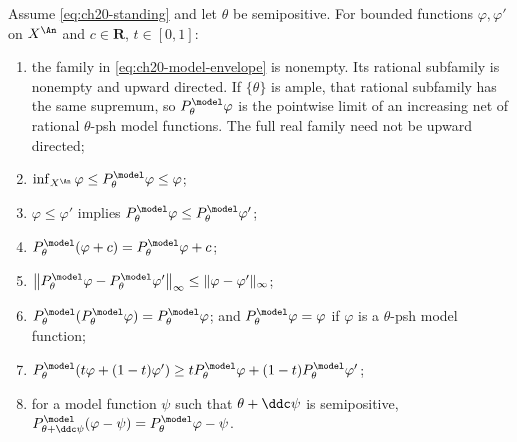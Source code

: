 \begin{theorem}
\label{thm:ch20-model-envelope}
Assume \eqref{eq:ch20-standing} and let $\theta$ be semipositive.  For
bounded functions $\varphi,\varphi'$ on $X^{\An}$ and $c\in\mathbf R$,
$t\in[0,1]$:
\begin{enumerate}
\item\label{itm:ch20-env:directed} the family in
 \eqref{eq:ch20-model-envelope} is nonempty.  Its rational subfamily is
 nonempty and upward directed.  If $\{\theta\}$ is ample, that rational
 subfamily has the same supremum, so
 $P^{\model}_\theta\varphi$ is the pointwise limit of an increasing net
 of rational $\theta$-psh model functions.  The full real family need not
 be upward directed;
\item\label{itm:ch20-env:bounds}
 $\inf_{X^{\An}}\varphi\leq P^{\model}_\theta\varphi\leq\varphi$;
\item\label{itm:ch20-env:monotone} $\varphi\leq\varphi'$ implies
 $P^{\model}_\theta\varphi\leq P^{\model}_\theta\varphi'$;
\item\label{itm:ch20-env:translate}
 $P^{\model}_\theta(\varphi+c)=P^{\model}_\theta\varphi+c$;
\item\label{itm:ch20-env:lipschitz}
 $\bigl\|P^{\model}_\theta\varphi-P^{\model}_\theta\varphi'\bigr\|_\infty
   \leq\|\varphi-\varphi'\|_\infty$;
\item\label{itm:ch20-env:idem}
 $P^{\model}_\theta(P^{\model}_\theta\varphi)=P^{\model}_\theta\varphi$;
 and $P^{\model}_\theta\varphi=\varphi$ if $\varphi$ is a
 $\theta$-psh model function;
\item\label{itm:ch20-env:concave}
 $P^{\model}_\theta(t\varphi+(1-t)\varphi')
   \geq tP^{\model}_\theta\varphi+(1-t)P^{\model}_\theta\varphi'$;
\item\label{itm:ch20-env:reference} for a model function $\psi$ such that
 $\theta+\ddc\psi$ is semipositive,
 $P^{\model}_{\theta+\ddc\psi}(\varphi-\psi)
    =P^{\model}_\theta\varphi-\psi$.
\end{enumerate}
\end{theorem}

